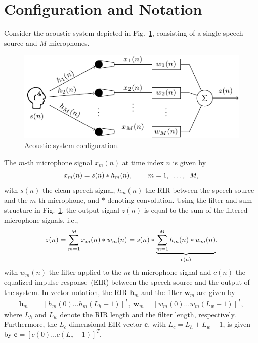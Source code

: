 \documentclass{article}
\begin{document}
\section{Configuration and Notation}
\label{sec: configuration}
Consider the acoustic system depicted in Fig.~\ref{fig: conf}, consisting of a single speech source and $M$ microphones. 
\begin{figure}[b!]
  \centering
  \includegraphics[scale=0.7]{config}
  \caption{Acoustic system configuration.}
  \label{fig: conf}
\end{figure}
The $m$-th microphone signal $x_m(n)$ at time index $n$ is given by
\begin{equation}
x_m(n) = s(n) \ast h_m(n), \; \; \; \; \; \; \; \; m = 1, \; \; \ldots, \; \; M,
\vspace{-0.15cm}
\end{equation}
with $s(n)$ the clean speech signal, $h_m(n)$ the RIR between the speech source and the $m$-th microphone, and $\ast$ denoting convolution.
Using the filter-and-sum structure in Fig.~\ref{fig: conf}, the output signal $z(n)$ is equal to the sum of the filtered microphone signals, i.e.,
\begin{equation}
\label{eq: out_sig}
z(n) = \sum_{m=1}^M x_m(n) \ast w_m(n) = s(n) \ast \underbrace{\sum_{m=1}^M h_m(n) \ast w_m(n)}_{c(n)},
\vspace{-0.15cm}
\end{equation}
with $w_m(n)$ the filter applied to the $m$-th microphone signal and $c(n)$ the equalized impulse response~(EIR) between the speech source and the output of the system.
In vector notation, the RIR $\mathbf{h}_m$ and the filter $\mathbf{w}_m$ are given by
\begin{align}
\!\!\!\!\mathbf{h}_m & \!=\! [h_m(0)  \ldots  h_m(L_h\!\!-\!\!1)]^T\!\!\!, \;\mathbf{w}_m \!=\! [w_m(0) \ldots w_m(L_w\!\!-\!\!1)]^T\!\!, \!\!\!\!
\end{align}
where $L_h$ and $L_w$ denote the RIR length and the filter length, respectively.
Furthermore, the $L_c$-dimensional EIR vector $\mathbf{c}$, with $L_c = L_h+L_w-1$, is given by $\mathbf{c} = [c(0) \ldots c(L_c-1)]^T$.
\end{document}
